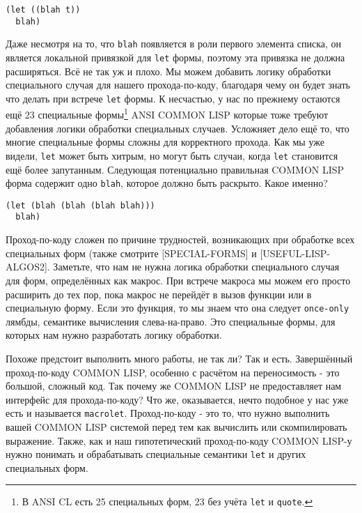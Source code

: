 \begin{verbatim}
(let ((blah t))
  blah)
\end{verbatim}

Даже несмотря на то, что \verb"blah" появляется в роли первого элемента списка, он является локальной привязкой для \verb"let" формы, поэтому эта привязка не должна расширяться. Всё не так уж и плохо. Мы можем добавить логику обработки специального случая для нашего прохода-по-коду, благодаря чему он будет знать что делать при встрече \verb"let" формы. К несчастью, у нас по прежнему остаются ещё 23 специальные формы\footnote{В ANSI CL есть 25 специальных форм, 23 без учёта \verb"let" и \verb"quote".} ANSI COMMON LISP которые тоже требуют добавления логики обработки специальных случаев. Усложняет дело ещё то, что многие специальные формы сложны для корректного прохода. Как мы уже видели, \verb"let" может быть хитрым, но могут быть случаи, когда \verb"let" становится ещё более запутанным. Следующая потенциально правильная COMMON LISP форма содержит одно \verb"blah", которое должно быть раскрыто. Какое именно?



\begin{verbatim}
(let (blah (blah (blah blah)))
  blah)
\end{verbatim}

Проход-по-коду сложен по причине трудностей, возникающих при обработке всех специальных форм (также смотрите [SPECIAL-FORMS] и [USEFUL-LISP-ALGOS2]. Заметьте, что нам не нужна логика обработки специального случая для форм, определённых как макрос. При встрече макроса мы можем его просто расширить до тех пор, пока макрос не перейдёт в вызов функции или в специальную форму. Если это функция, то мы знаем что она следует \verb"once-only" лямбды, семантике вычисления слева-на-право. Это специальные формы, для которых нам нужно разработать логику обработки.

Похоже предстоит выполнить много работы, не так ли? Так и есть. Завершённый проход-по-коду COMMON LISP, особенно с расчётом на переносимость - это большой, сложный код. Так почему же COMMON LISP не предоставляет нам интерфейс для прохода-по-коду? Что же, оказывается, нечто подобное у нас уже есть и называется \verb"macrolet". Проход-по-коду - это то, что нужно выполнить вашей COMMON LISP системой перед тем как вычислить или скомпилировать выражение. Также, как и наш гипотетический проход-по-коду COMMON LISP-у нужно понимать и обрабатывать специальные семантики \verb"let" и других специальных форм.

